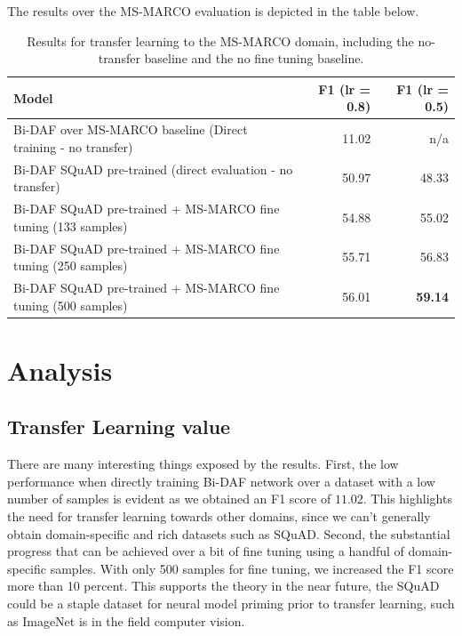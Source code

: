 \documentclass[11pt,a4paper]{article}
\begin{document}
The results over the MS-MARCO evaluation is depicted in the table below.

\begin{table}[t!]
\begin{center}
\begin{tabular}{|l|r|r|}
\hline \bf Model & \bf F1 (lr = 0.8) & \bf F1 (lr = 0.5) \\ \hline
Bi-DAF over MS-MARCO baseline (Direct training - no transfer) & 11.02 & n/a  \\
Bi-DAF SQuAD pre-trained (direct evaluation - no transfer) &  50.97 & 48.33 \\
Bi-DAF SQuAD pre-trained + MS-MARCO fine tuning (133 samples) & 54.88 & 55.02 \\
Bi-DAF SQuAD pre-trained + MS-MARCO fine tuning (250 samples) & 55.71 & 56.83 \\
Bi-DAF SQuAD pre-trained + MS-MARCO fine tuning (500 samples) & 56.01 & \bf 59.14 \\
\hline
\end{tabular}
\end{center}
\caption{\label{msmarco-table} Results for transfer learning to the MS-MARCO domain, including the no-transfer baseline and the no fine tuning baseline.}
\end{table}


\section{Analysis}
\label{sec:analysis}

\subsection {Transfer Learning value}

There are many interesting things exposed by the results. First, the low performance when directly training Bi-DAF network over a dataset with a low number of samples is evident as we obtained an F1 score of $11.02$. This highlights the need for transfer learning towards other domains, since we can't generally obtain domain-specific and rich datasets such as SQuAD. Second, the substantial progress that can be achieved over a bit of fine tuning using a handful of domain-specific samples. With only 500 samples for fine tuning, we increased the F1 score more than 10 percent. This supports the theory in the near future, the SQuAD could be a staple dataset for neural model priming prior to transfer learning, such as ImageNet is in the field computer vision.
\end{document}
